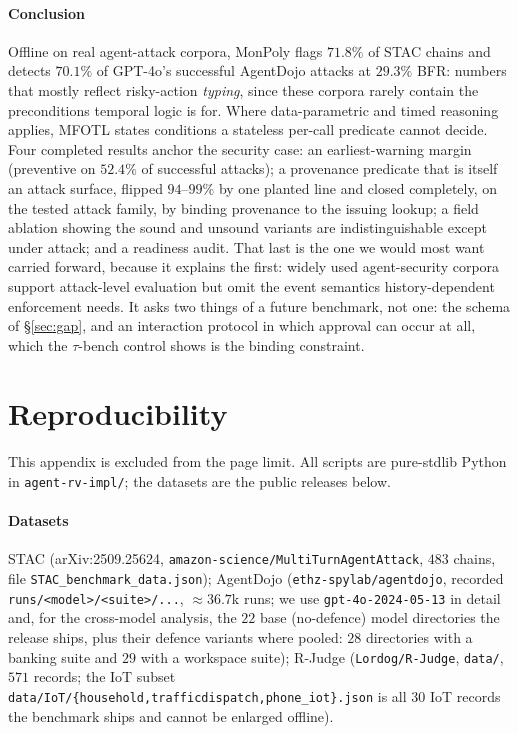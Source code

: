 \documentclass[sigconf]{acmart}
\begin{document}
\paragraph{Conclusion} Offline on real agent-attack corpora, MonPoly flags $71.8\%$ of
STAC chains and detects $70.1\%$ of GPT-4o's successful AgentDojo attacks at $29.3\%$
BFR: numbers that mostly reflect risky-action \emph{typing}, since these corpora rarely
contain the preconditions temporal logic is for. Where data-parametric and timed
reasoning applies, MFOTL states conditions a stateless per-call predicate cannot decide.
Four completed results anchor the security case: an earliest-warning margin (preventive
on $52.4\%$ of successful attacks); a provenance predicate that is itself an attack
surface, flipped $94$--$99\%$ by one planted line and closed completely, on the tested
attack family, by binding provenance to the issuing lookup; a field ablation showing the
sound and unsound variants are indistinguishable except under attack; and a readiness
audit. That last is the one we would most want carried forward, because it explains the
first: widely used agent-security corpora support attack-level evaluation but omit the
event semantics history-dependent enforcement needs. It asks two things of a future
benchmark, not one: the schema of \S\ref{sec:gap}, and an interaction protocol in which
approval can occur at all, which the $\tau$-bench control shows is the binding
constraint.

\balance



\appendix
\raggedbottom
\section{Reproducibility}
\label{app:repro}
\sloppy
This appendix is excluded from the page limit. All scripts are pure-stdlib Python in
\texttt{agent-rv-impl/}; the datasets are the public releases below.

\paragraph{Datasets} STAC (arXiv:2509.25624,
\texttt{amazon-science/\allowbreak Mul\-ti\-Turn\-Agent\-Attack},
$483$ chains, file \texttt{STAC\_\allowbreak benchmark\_\allowbreak data.json}); AgentDojo
(\texttt{ethz-spylab/\allowbreak agentdojo}, recorded
\texttt{runs/\allowbreak<model>/\allowbreak<suite>/...}, $\approx$$36.7$k
runs; we use \texttt{gpt-4o-2024-05-13} in detail and, for the cross-model analysis,
the $22$ base (no-defence) model directories the release ships, plus their defence
variants where pooled: $28$ directories with a banking suite and $29$ with a
workspace suite);
R-Judge (\texttt{Lordog/R-Judge}, \texttt{data/}, $571$ records; the IoT subset
\texttt{data/IoT/\{household,trafficdispatch,phone\_iot\}.json} is all $30$ IoT
records the benchmark ships and cannot be enlarged offline).
\end{document}

